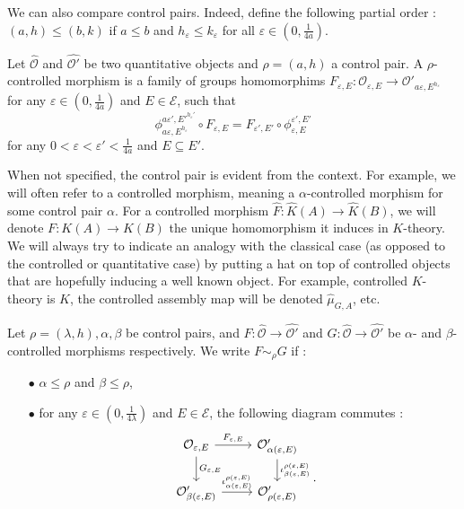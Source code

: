 We can also compare control pairs. Indeed, define the following partial order : $(a,h) \leq (b,k)$ if $a \leq b$ and $h_\varepsilon\leq k_\varepsilon$ for all $\varepsilon\in (0,\frac{1}{4a})$.\\ 

\begin{definition}
Let $\hat{\mathcal O}$ and $\hat{\mathcal O'}$ be two quantitative objects and $\rho=(a,h)$ a control pair. A $\rho$-controlled morphism is a family of groups homomorphims $F_{\varepsilon, E} : \mathcal O_{\varepsilon, E} \rightarrow \mathcal{ O'}_{a\varepsilon, E^{h_\varepsilon}}$ for any $\varepsilon\in(0,\frac{1}{4a})$ and $E\in\mathcal E$, such that
\[\phi^{a\varepsilon',E'^{h_\varepsilon'}}_{a\varepsilon,E^{h_\varepsilon}} \circ F_{\varepsilon, E} =F_{\varepsilon',E'} \circ \phi_{\varepsilon,E}^{\varepsilon',E'}\] for any $0<\varepsilon<\varepsilon'<\frac{1}{4a}$ and $E\subseteq E'$.
\end{definition}

\begin{rk}
When not specified, the control pair is evident from the context. For example, we will often refer to a controlled morphism, meaning a $\alpha$-controlled morphism for some control pair $\alpha$. For a controlled morphism $\hat F : \hat K(A)\rightarrow \hat K(B)$, we will denote $F:K(A)\rightarrow K(B)$ the unique homomorphism it induces in $K$-theory. We will always try to indicate an analogy with the classical case (as opposed to the controlled or quantitative case) by putting a hat on top of controlled objects that are hopefully inducing a well known object. For example, controlled $K$-theory is $\hat K$, the controlled assembly map will be denoted $\hat \mu_{G,A}$, etc.\\
\end{rk}

Let $\rho=(\lambda,h),\alpha,\beta$ be control pairs, and $F :  \hat{\mathcal O} \rightarrow \hat{\mathcal O'}$ and $G : \hat{\mathcal O} \rightarrow \hat{\mathcal O'}$ be $\alpha$- and $\beta$-controlled morphisms respectively. We write $F\sim_\rho G$ if :
\begin{itemize}%
\item[$\bullet$] $\alpha \leq \rho$ and $\beta \leq \rho$,
\item[$\bullet$] for any $\varepsilon\in (0,\frac{1}{4\lambda})$ and $E\in \mathcal E$, the following diagram commutes : 
\[\begin{tikzcd}
 \mathcal O_{\varepsilon,E} \arrow{r}{F_{\varepsilon,E}} \arrow{d}{G_{\varepsilon,E}} & \mathcal O'_{\alpha (\varepsilon,E) } 
\arrow{d}{\iota_{\beta(\varepsilon,E)}^{\rho(\varepsilon,E)}} \\
 \mathcal O'_{\beta (\varepsilon,E) } \arrow{r}{\iota_{\alpha(\varepsilon,E)}^{\rho(\varepsilon,E)}} & \mathcal O'_{\rho(\varepsilon,E)}\\
\end{tikzcd}.\]
\end{itemize}

